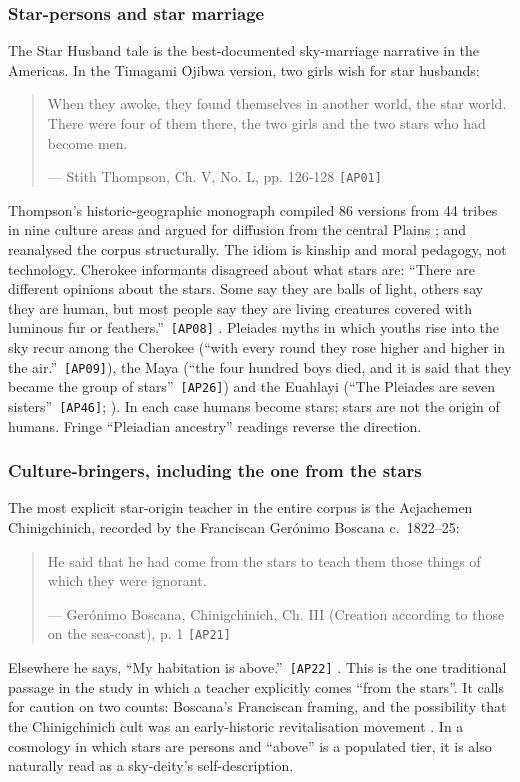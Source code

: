 \documentclass[11pt,a4paper]{article}
\newcommand{\pid}[1]{\texttt{\small #1}}
\begin{document}
\subsubsection{Star-persons and star marriage}

The Star Husband tale is the best-documented sky-marriage narrative in the Americas. In the Timagami Ojibwa version, two girls wish for star husbands: 
\begin{quote}\small When they awoke, they found themselves in another world, the star world. There were four of them there, the two girls and the two stars who had become men.\par\hfill{\footnotesize --- Stith Thompson, Ch. V, No. L, pp. 126-128 \pid{[AP01]}}\end{quote}
 Thompson's historic-geographic monograph compiled 86 versions from 44 tribes in nine culture areas and argued for diffusion from the central Plains \parencite{thompson1953star}; \textcite{dundes1965study} and \textcite{levistrauss1968origine} reanalysed the corpus structurally. The idiom is kinship and moral pedagogy, not technology. Cherokee informants disagreed about what stars are: \enquote{There are different opinions about the stars. Some say they are balls of light, others say they are human, but most people say they are living creatures covered with luminous fur or feathers.}~\pid{[AP08]} \parencite{mooney1900myths}. Pleiades myths in which youths rise into the sky recur among the Cherokee (\enquote{with every round they rose higher and higher in the air.}~\pid{[AP09]}), the Maya (\enquote{the four hundred boys died, and it is said that they became the group of stars}~\pid{[AP26]}) and the Euahlayi (\enquote{The Pleiades are seven sisters}~\pid{[AP46]}; \cite{parker1905euahlayi}). In each case humans become stars; stars are not the origin of humans. Fringe ``Pleiadian ancestry'' readings reverse the direction.

\subsubsection{Culture-bringers, including the one from the stars}

The most explicit star-origin teacher in the entire corpus is the Acjachemen Chinigchinich, recorded by the Franciscan Gerónimo Boscana c.~1822--25: 
\begin{quote}\small He said that he had come from the stars to teach them those things of which they were ignorant.\par\hfill{\footnotesize --- Gerónimo Boscana, Chinigchinich, Ch. III (Creation according to those on the sea-coast), p. 1 \pid{[AP21]}}\end{quote}
 Elsewhere he says, \enquote{My habitation is above.}~\pid{[AP22]} \parencite{boscana1846chinigchinich}. This is the one traditional passage in the study in which a teacher explicitly comes ``from the stars''. It calls for caution on two counts: Boscana's Franciscan framing, and the possibility that the Chinigchinich cult was an early-historic revitalisation movement \parencite{kroeber1925handbook,bean1978cults}. In a cosmology in which stars are persons and ``above'' is a populated tier, it is also naturally read as a sky-deity's self-description.
\end{document}
